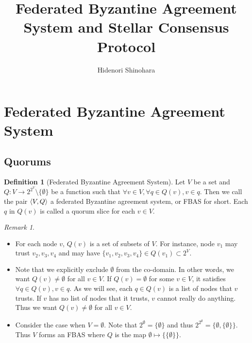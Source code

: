 \documentclass[12pt, psamsfonts]{amsart}
\theoremstyle{definition}
\newtheorem{defn}[thm]{Definition}
\theoremstyle{remark}
\newtheorem{rem}[thm]{Remark}
\numberwithin{equation}{subsection}
\begin{document}
\title{Federated Byzantine Agreement System and Stellar Consensus Protocol}
\author{Hidenori Shinohara}

\maketitle

\tableofcontents
\pagebreak

\section{Federated Byzantine Agreement System}
\subsection{Quorums}

\begin{defn}[Federated Byzantine Agreement System]
    Let $V$ be a set and $Q:V \rightarrow 2^{2^V} \setminus \{ \emptyset \}$ be a function such that $\forall v \in V, \forall q \in Q(v), v \in q$.
    Then we call the pair $\ev{V, Q}$ a federated Byzantine agreement system, or FBAS for short.
    Each $q$ in $Q(v)$ is called a quorum slice for each $v \in V$.
\end{defn}

\begin{rem}\label{rem_fbas}
    $ $
    \begin{itemize}
        \item
            For each node $v$, $Q(v)$ is a set of subsets of $V$.
            For instance, node $v_1$ may trust $v_2, v_3, v_4$ and may have $\{ v_1, v_2, v_3, v_4 \} \in Q(v_1) \subset 2^V$.
        \item
            Note that we explicitly exclude $\emptyset$ from the co-domain.
            In other words, we want $Q(v) \ne \emptyset$ for all $v \in V$.
            If $Q(v) = \emptyset$ for some $v \in V$, it satisfies $\forall q \in Q(v), v \in q$.
            As we will see, each $q \in Q(v)$ is a list of nodes that $v$ trusts.
            If $v$ has no list of nodes that it trusts, $v$ cannot really do anything.
            Thus we want $Q(v) \ne \emptyset$ for all $v \in V$.
        \item
            Consider the case when $V = \emptyset$.
            Note that $2^\emptyset = \{ \emptyset \}$ and thus $2^{2^\emptyset} = \{ \emptyset, \{ \emptyset \} \}$.
            Thus $V$ forms an FBAS where $Q$ is the map $\emptyset \mapsto \{ \{ \emptyset \} \}$.
    \end{itemize}
\end{rem}
\end{document}
